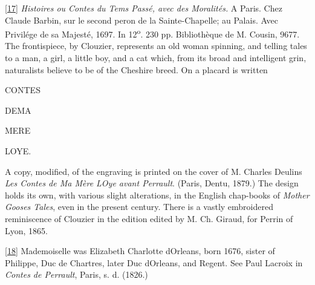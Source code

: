\documentclass[14pt,a4paper]{memoir}
\begin{document}
\protect\hypertarget{4533318093929944247_33931-h-0.htm.xhtmlux5cux23Footnote_17}{}{}\protect\hyperlink{4533318093929944247_33931-h-0.htm.xhtmlux5cux23FNanchor_17}{{{[}17{]}}}
\emph{Histoires ou Contes du Tems Passé, avec des Moralités.} A Paris.
Chez Claude Barbin, sur le second peron de la Sainte-Chapelle; au
Palais. Avec Privilége de sa Majesté, 1697. In 12\textsuperscript{o}.
230 pp. Bibliothèque de M. Cousin, 9677. The frontispiece, by Clouzier,
represents an old woman spinning, and telling tales to a man, a girl, a
little boy, and a cat which, from its broad and intelligent grin,
naturalists believe to be of the Cheshire breed. On a placard is written

CONTES

DEMA

MERE

LOYE.

A copy, modified, of the engraving is printed on the cover of M. Charles
Deulin\textquotesingle s \emph{Les Contes de Ma Mère
L\textquotesingle Oye avant Perrault}. (Paris, Dentu, 1879.) The design
holds its own, with various slight alterations, in the English
chap-books of \emph{Mother Goose\textquotesingle s Tales}, even in the
present century. There is a vastly
\textquotesingle embroidered\textquotesingle{} reminiscence of Clouzier
in the edition edited by M. Ch. Giraud, for Perrin of Lyon, 1865.

\protect\hypertarget{4533318093929944247_33931-h-0.htm.xhtmlux5cux23Footnote_18}{}{}\protect\hyperlink{4533318093929944247_33931-h-0.htm.xhtmlux5cux23FNanchor_18}{{{[}18{]}}}
Mademoiselle was Elizabeth Charlotte d\textquotesingle Orleans, born
1676, sister of Philippe, Duc de Chartres, later Duc
d\textquotesingle Orleans, and Regent. See Paul Lacroix in \emph{Contes
de Perrault}, Paris, s. d. (1826.)
\end{document}
